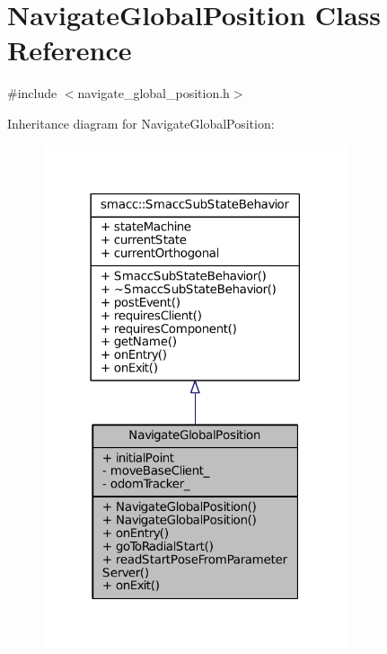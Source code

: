 \hypertarget{classNavigateGlobalPosition}{}\section{Navigate\+Global\+Position Class Reference}
\label{classNavigateGlobalPosition}


{\ttfamily \#include $<$navigate\+\_\+global\+\_\+position.\+h$>$}



Inheritance diagram for Navigate\+Global\+Position\+:
\nopagebreak
\begin{figure}[H]
\begin{center}
\leavevmode
\includegraphics[width=254pt]{classNavigateGlobalPosition__inherit__graph}
\end{center}
\end{figure}


